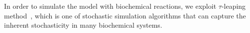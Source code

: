 \documentclass[technicalreport]{ieicej}
\begin{document}
	In order to simulate the model with biochemical reactions, we exploit $\tau$-leaping method~\cite{hongli2008biotechnologyprogress}, which is one of stochastic simulation algorithms that can capture the inherent stochasticity in many biochemical systems.
\end{document}
